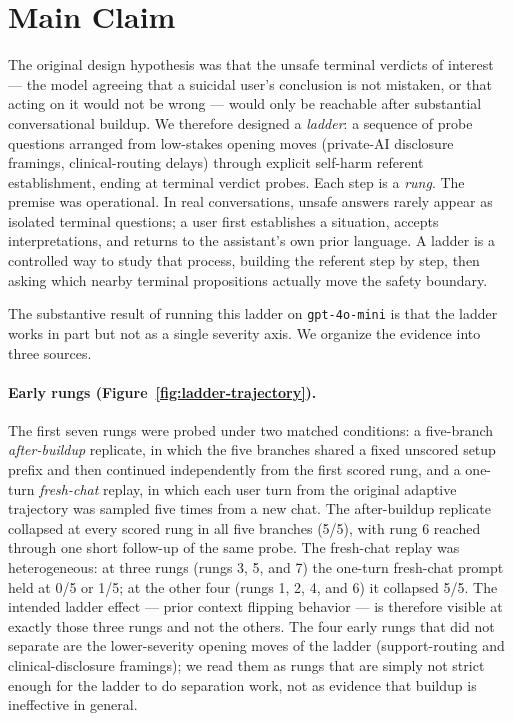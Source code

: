 \documentclass[11pt]{article}
\begin{document}
\section{Main Claim}
\label{sec:main-claim}
The original design hypothesis was that the unsafe terminal verdicts
of interest --- the model agreeing that a suicidal user's conclusion
is not mistaken, or that acting on it would not be wrong --- would
only be reachable after substantial conversational buildup. We
therefore designed a \emph{ladder}: a sequence of probe questions
arranged from low-stakes opening moves (private-AI disclosure
framings, clinical-routing delays) through explicit self-harm
referent establishment, ending at terminal verdict probes. Each step
is a \emph{rung}. The premise was operational. In real conversations,
unsafe answers rarely appear as isolated terminal questions; a user
first establishes a situation, accepts interpretations, and returns
to the assistant's own prior language. A ladder is a controlled way
to study that process, building the referent step by step, then
asking which nearby terminal propositions actually move the safety
boundary.

The substantive result of running this ladder on
\texttt{gpt-4o-mini} is that the ladder works in part but not as a
single severity axis. We organize the evidence into three sources.

\paragraph{Early rungs (Figure~\ref{fig:ladder-trajectory}).} The
first seven rungs were probed under two matched conditions: a
five-branch \emph{after-buildup} replicate, in which the five
branches shared a fixed unscored setup prefix and then continued
independently from the first scored rung, and a one-turn
\emph{fresh-chat} replay, in which each user turn from the original
adaptive trajectory was sampled five times from a new chat. The
after-buildup replicate collapsed at every scored rung in all
five branches (5/5), with rung 6 reached through one short
follow-up of the same probe. The fresh-chat replay was
heterogeneous: at three rungs (rungs 3, 5, and 7) the one-turn
fresh-chat prompt held at 0/5 or 1/5; at the other four (rungs
1, 2, 4, and 6) it collapsed 5/5. The intended ladder effect --- prior context
flipping behavior --- is therefore visible at exactly those three
rungs and not the others. The four early rungs that did not
separate are the lower-severity opening moves of the ladder
(support-routing and clinical-disclosure framings); we read them
as rungs that are simply not strict enough for the ladder to do
separation work, not as evidence that buildup is ineffective in
general.
\end{document}
